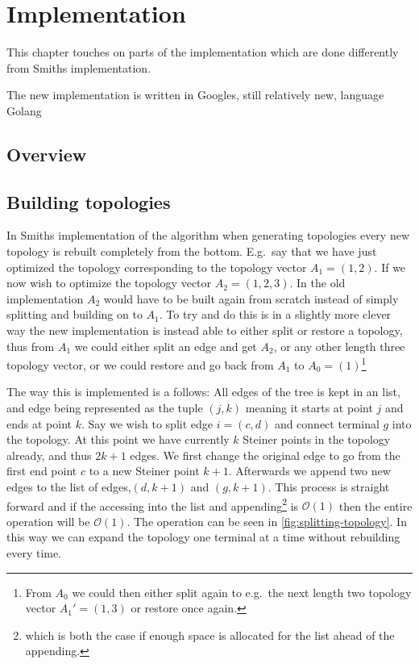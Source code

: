  {
\abnormalparskip{0pt}
\chapter{Implementation}
\label{cha:implementation}
}

This chapter touches on parts of the implementation which are done differently
from Smiths implementation.

The new implementation is written in Googles, still relatively new, language
Golang~\cite{GolangHomepage}

\section{Overview}
\label{sec:overview-1}


\section{Building topologies}
\label{sec:building-topologies}

In Smiths implementation of the algorithm when generating topologies every new
topology is rebuilt completely from the bottom.  E.g.\ say that we have just
optimized the topology corresponding to the topology vector $A_1 = (1, 2)$.  If we
now wish to optimize the topology vector $A_2 = (1, 2, 3)$.  In the old
implementation $A_2$ would have to be built again from scratch instead of simply
splitting and building on to $A_1$.  To try and do this is in a slightly more
clever way the new implementation is instead able to either split or restore a
topology, thus from $A_1$ we could either split an edge and get $A_2$, or any
other length three topology vector, or we could restore and go back from $A_1$
to $A_0 = (1)$\footnote{From $A_0$ we could then either split again to e.g.\ the
next length two topology vector $A_1' = (1, 3)$ or restore once again.}

The way this is implemented is a follows: All edges of the tree is kept in an
list, and edge being represented as the tuple $(j, k)$ meaning it starts at
point $j$ and ends at point $k$.  Say we wish to split edge $i = (c,d)$ and
connect terminal $g$ into the topology.  At this point we have currently $k$
Steiner points in the topology already, and thus $2k+1$ edges.  We first change
the original edge to go from the first end point $c$ to a new Steiner point
$k+1$.  Afterwards we append two new edges to the list of edges,$(d, k+1)$ and
$(g, k+1)$.  This process is straight forward and if the accessing into the list
and appending\footnote{which is both the case if enough space is allocated for
  the list ahead of the appending.} is $\mathcal{O}(1)$ then the entire
operation will be $\mathcal{O}(1)$. The operation can be seen in
\cref{fig:splitting-topology}.  In this way we can expand the topology one
terminal at a time without rebuilding every time.

